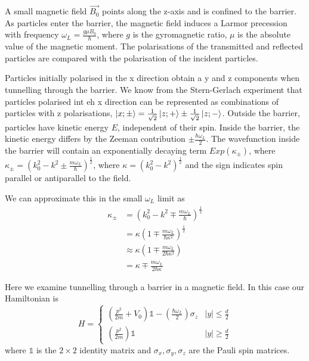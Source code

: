 \documentclass{article}
\begin{document}
A small magnetic field $\vec{B_{0}}$ points along the z-axis and is confined to the barrier. As particles enter the barrier, the magnetic field induces a Larmor precession with frequency $\omega_{L}=\frac{g \mu B_{0}}{\hbar}$, where $g$ is the gyromagnetic ratio, $\mu$ is the absolute value of the magnetic moment. The polarisations of the transmitted and reflected particles are compared with the polarisation of the incident particles.

Particles initially polarised in the x direction obtain a y and z components when tunnelling through the barrier. We know from the Stern-Gerlach experiment that particles polarised int eh x direction can be represented as combinations of particles with z polarisations, $\ket{x; \pm} = \frac{1}{\sqrt{2}}\ket{z;+} \pm \frac{1}{\sqrt{2}}\ket{z;-}$. Outside the barrier, particles have kinetic energy $E$, independent of their spin. Inside the barrier, the kinetic energy differs by the Zeeman contribution $\pm \frac{\hbar \omega_{L}}{2}$. The wavefunction inside the barrier will contain an exponentially decaying term $Exp(\kappa_{\pm})$, where $\kappa_{\pm} = (k^{2}_{0}-k^{2} \pm \frac{m \omega_L}{\hbar})^{\frac{1}{2}}$, where $\kappa = (k_{0}^2-k^2)^{\frac{1}{2}}$ and the sign indicates spin parallel or antiparallel to the field.  

We can approximate this in the small $\omega_L$ limit as
	\begin{align*}
		\kappa_{\pm} &= \left(k^{2}_{0}-k^{2} \mp \frac{m \omega_{L}}{\hbar}\right)^{\frac{1}{2}}\\	
			     &= \kappa \left(1 \mp \frac{m \omega_{L}}{\hbar \kappa^{2}}\right)^{\frac{1}{2}}\\
			     &\approx \kappa \left(1 \mp \frac{m \omega_{L}}{2\hbar \kappa^{2}}\right)\\
			      &= \kappa \mp \frac{m \omega_{L}}{2\hbar \kappa}
	\end{align*}

Here we examine tunnelling through a barrier in a magnetic field. In this case our Hamiltonian is
\begin{equation}
	H = 
	\begin{cases}
	\left(\frac{p^2}{2m} + V_0\right)\mathbb{1}-\left(\frac{\hbar \omega_L}{2}\right) \sigma_z & |y| \leq \frac{d}{2}\\
	\left(\frac{p^2}{2m}\right)\mathbb{1} & |y| \geq \frac{d}{2}
	\end{cases}
	\end{equation}
where $\mathbb{1}$ is the $2 \times 2$ identity matrix and $\sigma_{x}, \sigma_{y}, \sigma_{z}$ are the Pauli spin matrices.
\end{document}
